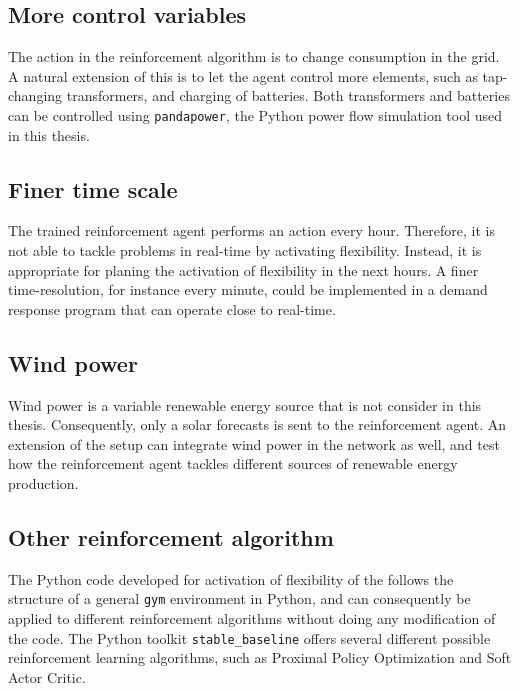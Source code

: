 \documentclass[class=book, crop=false, 11pt]{standalone}
\begin{document}
\subsection*{More control variables}
The action in the reinforcement algorithm is to change consumption in the grid. A natural extension of this is to let the agent control more elements, such as tap-changing transformers, and charging of batteries. Both transformers and batteries can be controlled using \texttt{pandapower}, the Python power flow simulation tool used in this thesis.
\subsection*{Finer time scale}
The trained reinforcement agent performs an action every hour. Therefore, it is not able to tackle problems in real-time by activating flexibility. Instead, it is appropriate for planing the activation of flexibility in the next hours. A finer time-resolution, for instance every minute, could be implemented in a demand response program that can operate close to real-time.
\subsection*{Wind power}
Wind power is a variable renewable energy source that is not consider in this thesis. Consequently, only a solar forecasts is sent to the reinforcement agent. An extension of the setup can integrate wind power in the network as well, and test how the reinforcement agent tackles different sources of renewable energy production.
\subsection*{Other reinforcement algorithm}
The Python code developed for activation of flexibility of the follows the structure of a general \texttt{gym} environment in Python, and can consequently be applied to different reinforcement algorithms without doing any modification of the code. The Python toolkit \texttt{stable\_baseline} offers several different possible reinforcement learning algorithms, such as Proximal Policy Optimization and Soft Actor Critic.
\end{document}
